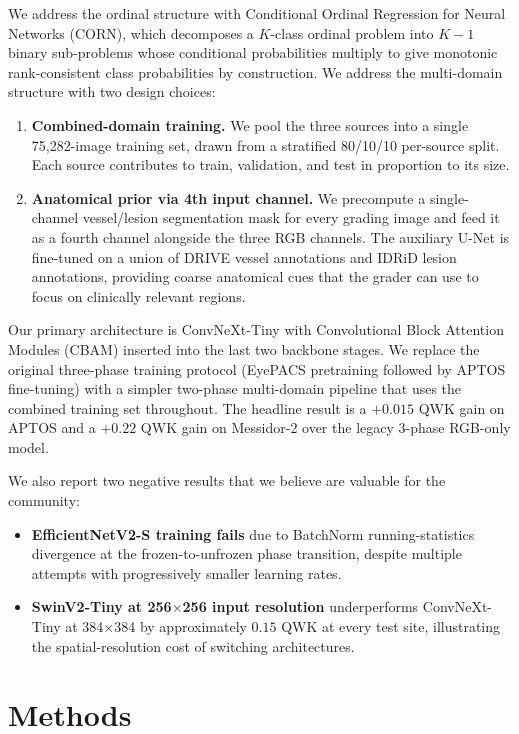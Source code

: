 \documentclass[11pt,a4paper]{article}
\begin{document}
We address the ordinal structure with Conditional Ordinal Regression for Neural Networks (CORN), which decomposes a $K$-class ordinal problem into $K-1$ binary sub-problems whose conditional probabilities multiply to give monotonic rank-consistent class probabilities by construction. We address the multi-domain structure with two design choices:
\begin{enumerate}
  \item \textbf{Combined-domain training.} We pool the three sources into a single 75{,}282-image training set, drawn from a stratified 80/10/10 per-source split. Each source contributes to train, validation, and test in proportion to its size.
  \item \textbf{Anatomical prior via 4th input channel.} We precompute a single-channel vessel/lesion segmentation mask for every grading image and feed it as a fourth channel alongside the three RGB channels. The auxiliary U-Net is fine-tuned on a union of DRIVE vessel annotations and IDRiD lesion annotations, providing coarse anatomical cues that the grader can use to focus on clinically relevant regions.
\end{enumerate}

Our primary architecture is ConvNeXt-Tiny with Convolutional Block Attention Modules (CBAM) inserted into the last two backbone stages. We replace the original three-phase training protocol (EyePACS pretraining followed by APTOS fine-tuning) with a simpler two-phase multi-domain pipeline that uses the combined training set throughout. The headline result is a $+0.015$ QWK gain on APTOS and a $+0.22$ QWK gain on Messidor-2 over the legacy 3-phase RGB-only model.

We also report two negative results that we believe are valuable for the community:
\begin{itemize}
  \item \textbf{EfficientNetV2-S training fails} due to BatchNorm running-statistics divergence at the frozen-to-unfrozen phase transition, despite multiple attempts with progressively smaller learning rates.
  \item \textbf{SwinV2-Tiny at 256$\times$256 input resolution} underperforms ConvNeXt-Tiny at 384$\times$384 by approximately $0.15$ QWK at every test site, illustrating the spatial-resolution cost of switching architectures.
\end{itemize}

\section{Methods}
\end{document}
